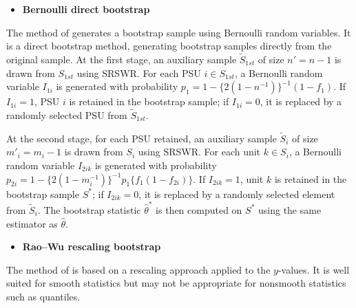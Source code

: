 \begin{itemize}
\tightlist
\item
  \textbf{Bernoulli direct bootstrap}
\end{itemize}

\noindent The method of \citet{Funaoka:Saigo:Sitter:Toida:2006} generates a bootstrap sample using Bernoulli random variables. It is a direct bootstrap method, generating bootstrap samples directly from the original sample. At the first stage, an auxiliary sample \(\tilde{\textrm{$S$}}_{1st}\) of size \(n' = n-1\) is drawn from \(\textrm{$S$}_{1st}\) using SRSWR. For each PSU \(i \in \textrm{$S$}_{1st}\), a Bernoulli random variable \(I_{1i}\) is generated with probability \(p_1 = 1-\{2(1-n^{-1})\}^{-1} (1-f_1).\) If \(I_{1i} = 1\), PSU \(i\) is retained in the bootstrap sample; if \(I_{1i} = 0\), it is replaced by a randomly selected PSU from \(\tilde{\textrm{$S$}}_{1st}\).

At the second stage, for each PSU retained, an auxiliary sample \(\tilde{\textrm{$S$}}_i\) of size \(m'_i = m_i - 1\) is drawn from \(\textrm{$S$}_i\) using SRSWR. For each unit \(k \in \textrm{$S$}_i\), a Bernoulli random variable \(I_{2ik}\) is generated with probability \(p_{2i} = 1- \{ 2(1-m_i^{-1}) \}^{-1} p_1 \{ f_1(1-f_{2i}) \}.\) If \(I_{2ik} = 1\), unit \(k\) is retained in the bootstrap sample \(\textrm{$S$}^*\); if \(I_{2ik} = 0\), it is replaced by a randomly selected element from \(\tilde{\textrm{$S$}}_i.\) The bootstrap statistic \(\hat{\theta}^*\) is then computed on \(\textrm{$S$}^*\) using the same estimator as \(\hat{\theta}\).

\begin{itemize}
\tightlist
\item
  \textbf{Rao--Wu rescaling bootstrap}
\end{itemize}

\noindent The method of \citet{Rao:Wu:1988} is based on a rescaling approach applied to the \(y\)-values. It is well suited for smooth statistics but may not be appropriate for nonsmooth statistics such as quantiles.

